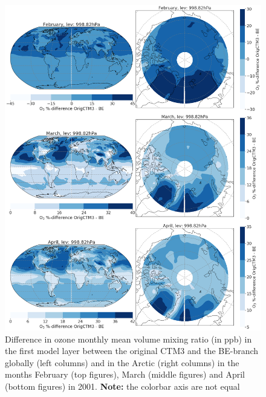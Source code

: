 \begin{figure}[h]
    \centering
    \includegraphics[width = \linewidth]{Chapter6_Results/images/Orig_BE_comp/BE_origPD_vmr_lev0_FebApr_2001.png}
    \caption{Difference in ozone monthly mean volume mixing ratio (in ppb) in the first model layer between the original CTM3 and the BE-branch globally (left columns) and in the Arctic (right columns) in the months February (top figures), March (middle figures) and April (bottom figures) in 2001. \textbf{Note:} the colorbar axis are not equal}
    \label{fig:BE_origPD_vmr_lev0_FebApr}
\end{figure}


